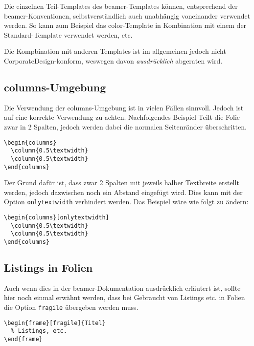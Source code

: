 Die einzelnen Teil-Templates des beamer-Templates können,
entsprechend der beamer-Konventionen, selbstverständlich
auch unabhängig voneinander verwendet werden.
So kann zum Beispiel das color-Template in Kombination mit einem der
Standard-Template verwendet werden, etc.

Die Kompbination mit anderen Templates ist im allgemeinen jedoch nicht
CorporateDesign-konform, weswegen davon \emph{ausdrücklich} abgeraten wird.

\subsection{columns-Umgebung}

Die Verwendung der columns-Umgebung ist in vielen Fällen sinnvoll.
Jedoch ist auf eine korrekte Verwendung zu achten.
Nachfolgendes Beispiel Teilt die Folie zwar in 2 Spalten,
jedoch werden dabei die normalen Seitenränder überschritten.

\begin{lstlisting}
\begin{columns}
  \column{0.5\textwidth}
  \column{0.5\textwidth}
\end{columns}
\end{lstlisting}

Der Grund dafür ist, dass zwar 2 Spalten mit jeweils halber Textbreite erstellt
werden, jedoch dazwischen noch ein Abstand eingefügt wird. Dies kann mit der
Option \lstinline{onlytextwidth} verhindert werden.
Das Beispiel wäre wie folgt zu ändern:

\begin{lstlisting}[morekeywords={onlytextwidth},keywordstyle=\color{tuOrange}]
\begin{columns}[onlytextwidth]
  \column{0.5\textwidth}
  \column{0.5\textwidth}
\end{columns}
\end{lstlisting}


\subsection{Listings in Folien}

Auch wenn dies in der beamer-Dokumentation ausdrücklich erläutert ist,
sollte hier noch einmal erwähnt werden, dass bei Gebraucht von Listings etc.
in Folien die Option \lstinline{fragile} übergeben werden muss.

\begin{lstlisting}
\begin{frame}[fragile]{Titel}
  % Listings, etc.
\end{frame}
\end{lstlisting}



